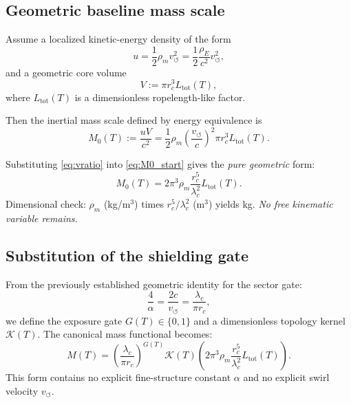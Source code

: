 \documentclass[11pt, a4paper]{article}
\begin{document}
            \subsection{Geometric baseline mass scale}
                Assume a localized kinetic-energy density of the form
                \begin{equation}
                    u = \frac{1}{2}\rho_m v_{\circlearrowleft}^2
                    = \frac{1}{2}\frac{\rho_E}{c^2} v_{\circlearrowleft}^2,
                    \label{eq:u_def}
                \end{equation}
                and a geometric core volume
                \begin{equation}
                    V := \pi r_c^3 L_{\mathrm{tot}}(T),
                    \label{eq:V_def}
                \end{equation}
                where $L_{\mathrm{tot}}(T)$ is a dimensionless ropelength-like factor.
                
                Then the inertial mass scale defined by energy equivalence is
                \begin{equation}
                    M_0(T) := \frac{uV}{c^2}
                    = \frac{1}{2}\rho_m\left(\frac{v_{\circlearrowleft}}{c}\right)^2 \pi r_c^3 L_{\mathrm{tot}}(T).
                    \label{eq:M0_start}
                \end{equation}
                
                Substituting \eqref{eq:vratio} into \eqref{eq:M0_start} gives the \emph{pure geometric} form:
                \begin{equation}
                    M_0(T) = 2\pi^3 \rho_m \frac{r_c^5}{\lambda_c^2} L_{\mathrm{tot}}(T).
                    \label{eq:M0_geom}
                \end{equation}
                Dimensional check: $\rho_m$ (kg/m$^3$) times $r_c^5/\lambda_c^2$ (m$^3$) yields kg. \emph{No free kinematic variable remains.}
            
            \subsection{Substitution of the shielding gate}
                From the previously established geometric identity for the sector gate:
                \begin{equation}
                    \frac{4}{\alpha}=\frac{2c}{v_{\circlearrowleft}}=\frac{\lambda_c}{\pi r_c},
                    \label{eq:gate_geom}
                \end{equation}
                we define the exposure gate $G(T)\in\{0,1\}$ and a dimensionless topology kernel $\mathcal{K}(T)$.
                The canonical mass functional becomes:
                \begin{equation}
                    M(T) = \left(\frac{\lambda_c}{\pi r_c}\right)^{G(T)} \mathcal{K}(T) \left( 2\pi^3 \rho_m \frac{r_c^5}{\lambda_c^2} L_{\mathrm{tot}}(T) \right).
                    \label{eq:M_master}
                \end{equation}
                This form contains no explicit fine-structure constant $\alpha$ and no explicit swirl velocity $v_{\circlearrowleft}$.
            
\end{document}
